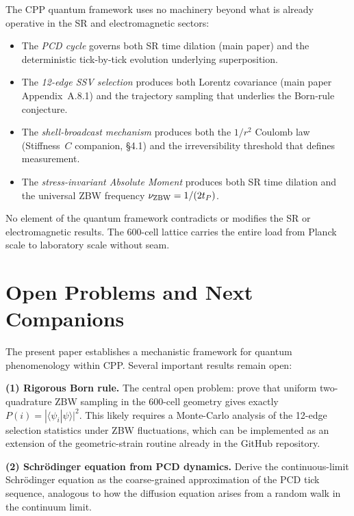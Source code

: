 \documentclass[12pt]{article}
\newcommand{\tP}{t_P}
\begin{document}
The CPP quantum framework uses no machinery beyond what is already operative
in the SR and electromagnetic sectors:

\begin{itemize}[noitemsep]
  \item The \emph{PCD cycle} governs both SR time dilation (main paper) and
    the deterministic tick-by-tick evolution underlying superposition.
  \item The \emph{12-edge SSV selection} produces both Lorentz covariance
    (main paper Appendix~A.8.1) and the trajectory sampling that underlies
    the Born-rule conjecture.
  \item The \emph{shell-broadcast mechanism} produces both the $1/r^2$
    Coulomb law (Stiffness~$C$ companion, \S 4.1) and the irreversibility
    threshold that defines measurement.
  \item The \emph{stress-invariant Absolute Moment} produces both SR time
    dilation and the universal ZBW frequency $\nu_{\rm ZBW} = 1/(2\tP)$.
\end{itemize}

No element of the quantum framework contradicts or modifies the SR or
electromagnetic results.  The 600-cell lattice carries the entire load from
Planck scale to laboratory scale without seam.

\section{Open Problems and Next Companions}
\label{sec:open}

The present paper establishes a mechanistic framework for quantum
phenomenology within CPP.  Several important results remain open:

\textbf{(1) Rigorous Born rule.}  The central open problem: prove that
uniform two-quadrature ZBW sampling in the 600-cell geometry gives exactly
$P(i) = |\langle\psi_i|\psi\rangle|^2$.  This likely requires a Monte-Carlo
analysis of the 12-edge selection statistics under ZBW fluctuations, which
can be implemented as an extension of the geometric-strain routine already
in the GitHub repository.

\textbf{(2) Schr\"odinger equation from PCD dynamics.}  Derive the
continuous-limit Schr\"odinger equation as the coarse-grained approximation
of the PCD tick sequence, analogous to how the diffusion equation arises from
a random walk in the continuum limit.
\end{document}
